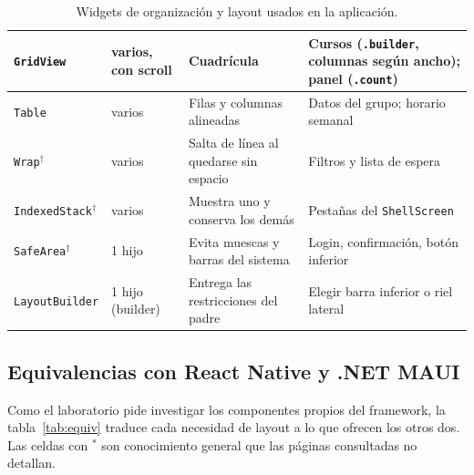 \begin{table}[H]
\begin{tabularx}{\textwidth}{|p{2.7cm}|p{1.8cm}|X|X|}
		\texttt{GridView} & varios, con scroll & Cuadrícula & Cursos (\texttt{.builder}, columnas según ancho); panel (\texttt{.count}) \\\hline
		\texttt{Table} & varios & Filas y columnas alineadas & Datos del grupo; horario semanal \\\hline
		\texttt{Wrap}$^\dagger$ & varios & Salta de línea al quedarse sin espacio & Filtros y lista de espera \\\hline
		\texttt{IndexedStack}$^\dagger$ & varios & Muestra uno y conserva los demás & Pestañas del \texttt{ShellScreen} \\\hline
		\texttt{SafeArea}$^\dagger$ & 1 hijo & Evita muescas y barras del sistema & Login, confirmación, botón inferior \\\hline
		\texttt{LayoutBuilder} & 1 hijo (builder) & Entrega las restricciones del padre & Elegir barra inferior o riel lateral \\\hline
	\end{tabularx}
	\caption{Widgets de organización y layout usados en la aplicación.}
	\label{tab:catalogo}
\end{table}

\subsection{Equivalencias con React Native y .NET MAUI}
Como el laboratorio pide investigar los componentes propios del framework, la tabla~\ref{tab:equiv} traduce cada necesidad de layout a lo que ofrecen los otros dos. Las celdas con $^\ast$ son conocimiento general que las páginas consultadas no detallan.

